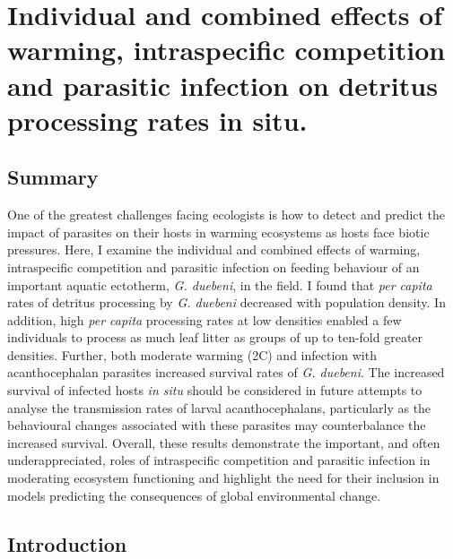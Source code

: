 \chapter[Individual and combined effects of warming, intraspecific competition and parasitic infection on detritus processing rates in situ.]{Individual and combined effects of warming, intraspecific competition and parasitic infection on detritus processing rates in situ.}
\label{chap:shannon}

\section{Summary}
One of the greatest challenges facing ecologists is how to detect and predict the impact of parasites on their hosts in warming ecosystems as hosts face biotic pressures. Here, I examine the individual and combined effects of warming, intraspecific competition and parasitic infection on feeding behaviour of an important aquatic ectotherm, \emph{G. duebeni}, in the field. I found that \emph{per capita} rates of detritus processing by \emph{G. duebeni} decreased with population density. In addition, high \emph{per capita} processing rates at low densities enabled a few individuals to process as much leaf litter as groups of up to ten-fold greater densities. Further, both moderate warming (2\degree C) and infection with acanthocephalan parasites increased survival rates of \emph{G. duebeni}. The increased survival of infected hosts \emph{in situ} should be considered in future attempts to analyse the transmission rates of larval acanthocephalans, particularly as the behavioural changes associated with these parasites may counterbalance the increased survival. Overall, these results demonstrate the important, and often underappreciated, roles of intraspecific competition and parasitic infection in moderating ecosystem functioning and highlight the need for their inclusion in models predicting the consequences of global environmental change.

\section{Introduction}

